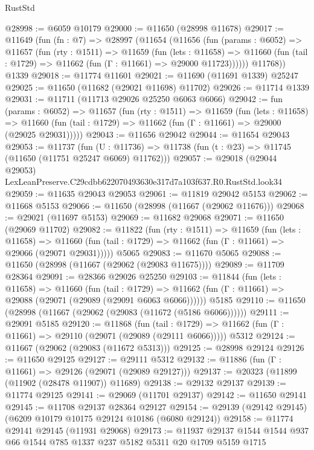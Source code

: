 \begin{lexlean}{RustStd}
\begin{coremodule}
@28998 := @6059 @10179
@29000 := @11650 (@28998 @11678)
@29017 := @11649
    (fun (fn : @7) =>
    @28997
      (@11654
        (@11656
          (fun (params : @6052) =>
          @11657
            (fun (rty : @1511) =>
            @11659
              (fun (lets : @11658) =>
              @11660 (fun (tail : @1729) => @11662 (fun (Γ : @11661) => @29000 @11723))))))
        @11768))
    @1339
@29018 := @11774 @11601
@29021 := @11690 (@11691 @1339) @25247
@29025 := @11650 (@11682 (@29021 @11698) @11702)
@29026 := @11714 @1339
@29031 := @11711 (@11713 @29026 @25250 @6063 @6066)
@29042 := fun (params : @6052) =>
  @11657
    (fun (rty : @1511) =>
    @11659
      (fun (lets : @11658) =>
      @11660 (fun (tail : @1729) => @11662 (fun (Γ : @11661) => @29000 (@29025 @29031)))))
@29043 := @11656 @29042
@29044 := @11654 @29043
@29053 := @11737
    (fun (U : @11736) => @11738 (fun (t : @23) => @11745 (@11650 (@11751 @25247 @6069) @11762)))
@29057 := @29018 (@29044 @29053) LexLeanPreserve.C29cdbb622070493630e317d7a103f637.R0.RustStd.look34
@29059 := @11635 @29043 @29053
@29061 := @11819 @29042 @5153
@29062 := @11668 @5153
@29066 := @11650 (@28998 (@11667 (@29062 @11676)))
@29068 := @29021 (@11697 @5153)
@29069 := @11682 @29068
@29071 := @11650 (@29069 @11702)
@29082 := @11822
    (fun (rty : @1511) =>
    @11659
      (fun (lets : @11658) =>
      @11660 (fun (tail : @1729) => @11662 (fun (Γ : @11661) => @29066 (@29071 @29031)))))
    @5065
@29083 := @11670 @5065
@29088 := @11650 (@28998 (@11667 (@29062 (@29083 @11675))))
@29089 := @11709 @28364
@29091 := @28366 @29026 @25250
@29103 := @11844
    (fun (lets : @11658) =>
    @11660
      (fun (tail : @1729) =>
      @11662 (fun (Γ : @11661) => @29088 (@29071 (@29089 (@29091 @6063 @6066))))))
    @5185
@29110 := @11650 (@28998 (@11667 (@29062 (@29083 (@11672 (@5186 @6066))))))
@29111 := @29091 @5185
@29120 := @11868
    (fun (tail : @1729) => @11662 (fun (Γ : @11661) => @29110 (@29071 (@29089 (@29111 @6066)))))
    @5312
@29124 := @11667 (@29062 (@29083 (@11672 @5313)))
@29125 := @28998 @29124
@29126 := @11650 @29125
@29127 := @29111 @5312
@29132 := @11886 (fun (Γ : @11661) => @29126 (@29071 (@29089 @29127)))
@29137 := @20323 (@11899 (@11902 (@28478 @11907)) @11689)
@29138 := @29132 @29137
@29139 := @11774 @29125
@29141 := @29069 (@11701 @29137)
@29142 := @11650 @29141
@29145 := @11708 @29137 @28364 @29127
@29154 := @29139 (@29142 @29145) (@6209 @10179 @10175 @29124 @10186 (@6080 @29124))
@29158 := @11774 @29141 @29145 (@11931 @29068)
@29173 := @11937 @29137 @1544 @1544 @937 @66 @1544 @785 @1337 @237 @5182 @5311 @20 @1709 @5159 @1715

\end{coremodule}
\end{lexlean}
